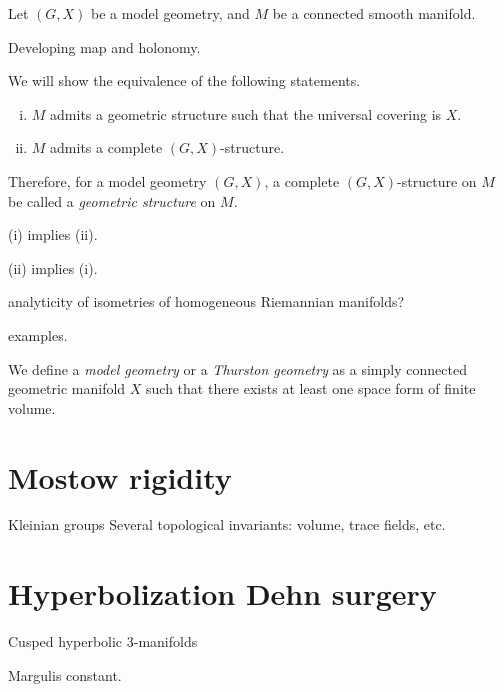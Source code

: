 \documentclass{../note}
\begin{document}
\begin{prb}
Let $(G,X)$ be a model geometry, and $M$ be a connected smooth manifold.

Developing map and holonomy.

We will show the equivalence of the following statements.
\begin{enumerate}[(i)]
\item $M$ admits a geometric structure such that the universal covering is $X$.
\item $M$ admits a complete $(G,X)$-structure.
\end{enumerate}
Therefore, for a model geometry $(G,X)$, a complete $(G,X)$-structure on $M$ be called a \emph{geometric structure} on $M$.
\begin{parts}
\item (i) implies (ii).
\item (ii) implies (i).
\end{parts}
\end{prb}

analyticity of isometries of homogeneous Riemannian manifolds?

examples.

\begin{prb}
We define a \emph{model geometry} or a \emph{Thurston geometry} as a simply connected geometric manifold $X$ such that there exists at least one space form of finite volume.
\end{prb}


\section{Mostow rigidity}
Kleinian groups
Several topological invariants: volume, trace fields, etc.


\section{Hyperbolization Dehn surgery}

\begin{prb}
Cusped hyperbolic 3-manifolds
\end{prb}

\begin{prb}
\end{prb}

\begin{prb}
Margulis constant.
\end{prb}
\end{document}

